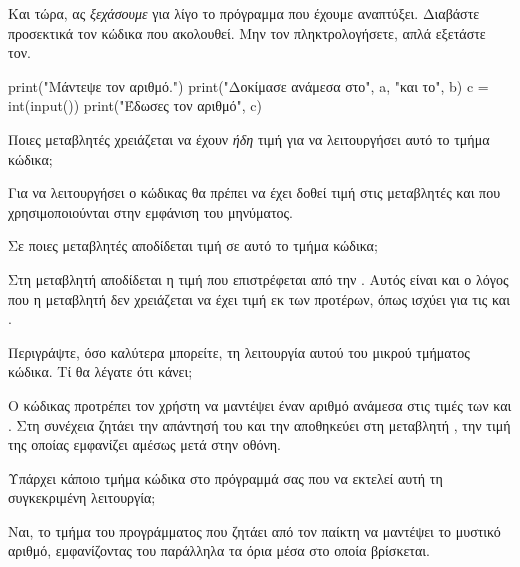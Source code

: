 \documentclass[a4paper,11pt,oneside]{book}
\begin{document}
\begin{step}
Και τώρα, ας \emph{ξεχάσουμε} για λίγο το πρόγραμμα που έχουμε αναπτύξει. Διαβάστε προσεκτικά τον κώδικα που ακολουθεί. Μην τον πληκτρολογήσετε, απλά εξετάστε τον.

\begin{pyplain}
print("Μάντεψε τον αριθμό.")
print("Δοκίμασε ανάμεσα στο", a, "και το", b)
c = int(input())    
print("Έδωσες τον αριθμό", c)
\end{pyplain}

Ποιες μεταβλητές χρειάζεται να έχουν \emph{ήδη} τιμή για να λειτουργήσει αυτό το τμήμα κώδικα;

\begin{answer}
Για να λειτουργήσει ο κώδικας θα πρέπει να έχει δοθεί τιμή στις μεταβλητές  και  που χρησιμοποιούνται στην εμφάνιση του μηνύματος. 
\end{answer}

Σε ποιες μεταβλητές αποδίδεται τιμή σε αυτό το τμήμα κώδικα; 

\begin{answer}
Στη μεταβλητή  αποδίδεται η τιμή που επιστρέφεται από την . Αυτός είναι και ο λόγος που η μεταβλητή  δεν χρειάζεται να έχει τιμή εκ των προτέρων, όπως ισχύει για τις  και .
\end{answer}

Περιγράψτε, όσο καλύτερα μπορείτε, τη λειτουργία αυτού του μικρού τμήματος κώδικα. Τί θα λέγατε ότι κάνει;

\begin{answer}
Ο κώδικας προτρέπει τον χρήστη να μαντέψει έναν αριθμό ανάμεσα στις τιμές των  και . Στη συνέχεια ζητάει την απάντησή του και την αποθηκεύει στη μεταβλητή , την τιμή της οποίας εμφανίζει αμέσως μετά στην οθόνη.
\end{answer}

Υπάρχει κάποιο τμήμα κώδικα στο πρόγραμμά σας που να εκτελεί αυτή τη συγκεκριμένη λειτουργία; 

\begin{answer}
Ναι, το τμήμα του προγράμματος που ζητάει από τον παίκτη να μαντέψει το μυστικό αριθμό, εμφανίζοντας του παράλληλα τα όρια μέσα στο οποία βρίσκεται.
\end{answer}
\end{step}
\end{document}
